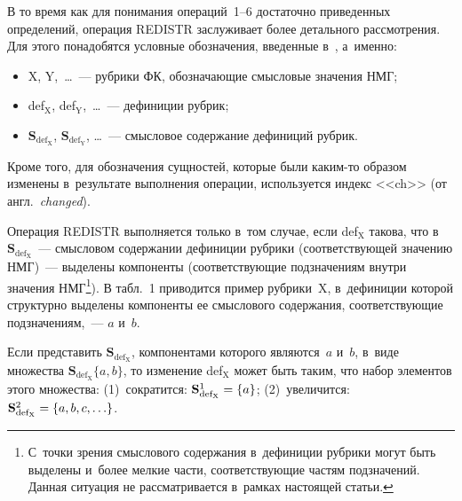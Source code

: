 \begin{multicols}{2}
В то время как для понимания операций~\mbox{1--6} достаточно приведенных 
определений, операция REDISTR заслуживает более детального 
рассмотрения. Для этого понадобятся условные обозначения, введенные 
в~\cite{3-gon}, а~именно:
\begin{itemize}
\item X, Y,\ \ldots~--- рубрики ФК, обозначающие смыс\-ло\-вые значения 
НМГ;
\item def$_{\mathrm{X}}$, def$_{\mathrm{Y}}$,\ \ldots~---  дефиниции 
рубрик;
\item $\mathbf{S}_{\mathrm{def}_{\mathrm{X}}}$, 
$\mathbf{S}_{\mathrm{def}_{\mathrm{Y}}}$, \ldots ~--- смысловое 
содержание дефиниций рубрик.
\end{itemize}
Кроме того, для обозначения сущностей, которые были каким-то образом 
изменены в~результате выполнения операции, используется индекс <<ch>> 
(от англ.\ \textit{changed}).

Операция REDISTR выполняется только в~том случае, если 
def$_{\mathrm{X}}$ такова, что 
в~$\mathbf{S}_{\mathrm{def}_{\mathrm{X}}}$~--- смысловом содержании 
дефиниции рубрики (соответствующей значению НМГ)~--- выделены 
компоненты (соответствующие подзначениям внутри значения 
НМГ\footnote{С~точки зрения смыслового содержания в~дефиниции рубрики могут быть 
выделены и~более мелкие части, соответствующие частям подзначений. Данная ситуация не 
рассматривается в~рамках настоящей статьи.}). В табл.~1 приводится пример  
руб\-ри\-ки~X, в~дефиниции которой структурно выделены компоненты ее 
смыслового содержания, соответствующие подзначениям,~--- $a$ и~$b$.




Если представить $\mathbf{S}_{\mathrm{def_X}}$, компонентами которого 
являются~$a$ и~$b$, в~виде множества 
$\mathbf{S}_{\mathrm{def_X}}\{a,b\}$, то изменение def$_{\mathrm{X}}$ 
может быть таким, что набор элементов этого множества: (1)~сократится: 
$\mathbf{S}_{\mathrm{def_X}}^1\hm=\{a\}$; (2)~увеличится: 
$\mathbf{S}_{\mathrm{def_X}}^2\hm=\{a, b, c, \ldots\}$.




\end{multicols}
